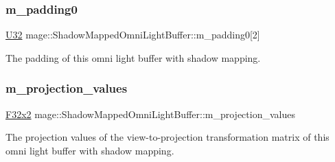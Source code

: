 \subsubsection{\texorpdfstring{m\+\_\+padding0}{m\_padding0}}
{\footnotesize\ttfamily \hyperlink{namespacemage_a41c104c036fba3756a74e19f793eeaa1}{U32} mage\+::\+Shadow\+Mapped\+Omni\+Light\+Buffer\+::m\+\_\+padding0\mbox{[}2\mbox{]}}

The padding of this omni light buffer with shadow mapping. \hypertarget{structmage_1_1_shadow_mapped_omni_light_buffer_a388cae8ff9e11f1e70c385941effc2d4}{}\label{structmage_1_1_shadow_mapped_omni_light_buffer_a388cae8ff9e11f1e70c385941effc2d4} 
\subsubsection{\texorpdfstring{m\+\_\+projection\+\_\+values}{m\_projection\_values}}
{\footnotesize\ttfamily \hyperlink{namespacemage_aa87237ad091f5cd7da612b8523fc108f}{F32x2} mage\+::\+Shadow\+Mapped\+Omni\+Light\+Buffer\+::m\+\_\+projection\+\_\+values}

The projection values of the view-\/to-\/projection transformation matrix of this omni light buffer with shadow mapping. 
